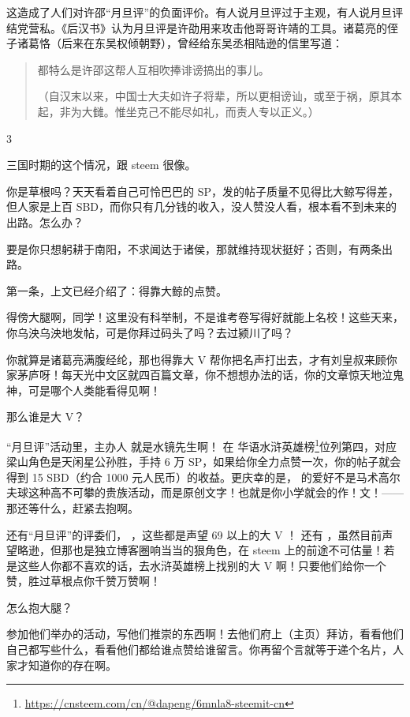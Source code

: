 \documentclass[]{ctexbook}
\renewcommand{\href}[2]{#2\footnote{\url{#1}}}
\begin{document}
这造成了人们对许邵``月旦评''的负面评价。有人说月旦评过于主观，有人说月旦评结党营私。《后汉书》认为月旦评是许劭用来攻击他哥哥许靖的工具。诸葛亮的侄子诸葛恪（后来在东吴权倾朝野），曾经给东吴丞相陆逊的信里写道：

\begin{quote}
都特么是许邵这帮人互相吹捧诽谤搞出的事儿。

（自汉末以来，中国士大夫如许子将辈，所以更相谤讪，或至于祸，原其本起，非为大雠。惟坐克己不能尽如礼，而责人专以正义。）
\end{quote}

3

三国时期的这个情况，跟 steem 很像。

你是草根吗？天天看着自己可怜巴巴的 SP，发的帖子质量不见得比大鲸写得差，但人家是上百 SBD，而你只有几分钱的收入，没人赞没人看，根本看不到未来的出路。怎么办？

要是你只想躬耕于南阳，不求闻达于诸侯，那就维持现状挺好；否则，有两条出路。

第一条，上文已经介绍了：得靠大鲸的点赞。

得傍大腿啊，同学！这里没有科举制，不是谁考卷写得好就能上名校！这些天来，你乌泱乌泱地发帖，可是你拜过码头了吗？去过颍川了吗？

你就算是诸葛亮满腹经纶，那也得靠大 V 帮你把名声打出去，才有刘皇叔来顾你家茅庐呀！每天光中文区就四百篇文章，你不想想办法的话，你的文章惊天地泣鬼神，可是哪个人类能看得见啊！

那么谁是大 V？

``月旦评''活动里，主办人 \citet{rivalhw} 就是水镜先生啊！\citet{rivalhw} 在 \href{https://cnsteem.com/cn/@dapeng/6mnla8-steemit-cn}{华语水浒英雄榜}位列第四，对应梁山角色是天闲星公孙胜，手持 6 万 SP，如果给你全力点赞一次，你的帖子就会得到 15 SBD（约合 1000 元人民币）的收益。更庆幸的是，\citet{rivalhw} 的爱好不是马术高尔夫球这种高不可攀的贵族活动，而是原创文字！也就是你小学就会的作！文！------那还等什么，赶紧去抱啊。

还有``月旦评''的评委们， \citet{deanliu} \citet{lemooljiang} \citet{tumutanzi}，这些都是声望 69 以上的大 V ！ 还有 \citet{hannahwu}，虽然目前声望略逊，但那也是独立博客圈响当当的狠角色，在 steem 上的前途不可估量！若是这些人你都不喜欢的话，去水浒英雄榜上找别的大 V 啊！只要他们给你一个赞，胜过草根点你千赞万赞啊！

怎么抱大腿？

参加他们举办的活动，写他们推崇的东西啊！去他们府上（主页）拜访，看看他们自己都写些什么，看看他们都给谁点赞给谁留言。你再留个言就等于递个名片，人家才知道你的存在啊。
\end{document}
